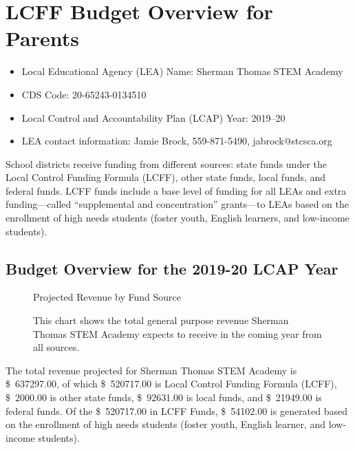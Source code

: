\documentclass{article}
\newcommand{\pieslicecaption}[3]{{#1, \dollar{#2}, \SI{#3}{\percent}}}
\newcommand{\dollar}[1]{\SI{#1}[\$]{}}
\begin{document}
\section{LCFF Budget Overview for Parents}
\begin{itemize}[noitemsep,label={}]
\item Local Educational Agency (LEA) Name: Sherman Thomas STEM Academy
\item CDS Code: 20-65243-0134510
\item Local Control and Accountability Plan (LCAP) Year: 2019--20
\item LEA contact information: Jamie Brock, 559-871-5490, jabrock@stcsca.org
\end{itemize}

School districts receive funding from different sources: state funds under the Local Control Funding Formula (LCFF), other state funds, local funds, and federal funds. LCFF funds include a base level of funding for all LEAs and extra funding---called ``supplemental and concentration'' grants---to LEAs based on the enrollment of high needs students (foster youth, English learners, and low-income students).

\subsection{Budget Overview for the 2019-20 LCAP Year}
\begin{figure}[hbtp]
\centering
Projected Revenue by Fund Source
	\caption*{This chart shows the total general purpose revenue Sherman Thomas STEM Academy expects to receive in the coming year from all sources.}
\end{figure}

The total revenue projected for Sherman Thomas STEM Academy is \dollar{637297.00}, of which \dollar{520717.00} is Local Control Funding Formula (LCFF), \dollar{2000.00} is other state funds, \dollar{92631.00} is local funds, and \dollar{21949.00} is federal funds. Of the \dollar{520717.00} in LCFF Funds, \dollar{54102.00} is generated based on the enrollment of high needs students (foster youth, English learner, and low-income students).
\end{document}
